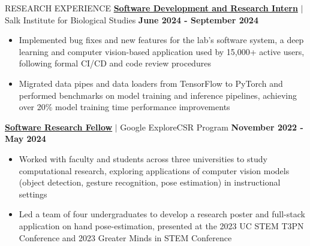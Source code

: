 \documentclass{resume}
\begin{document}
\begin{rSection}{RESEARCH EXPERIENCE}
    \href{https://talmolab.org/}{\textbf{Software Development and Research Intern}} $|$ Salk Institute for Biological Studies \hfill \textbf{June 2024 - September 2024}
    \vspace{-4pt}
    \begin{itemize}
        \itemsep -3pt {}
            \item Implemented bug fixes and new features for the lab's software system, a deep learning and computer vision-based application used by 15,000+ active users, following formal CI/CD and code review procedures
            \item  Migrated data pipes and data loaders from TensorFlow to PyTorch and performed benchmarks on model training and inference pipelines, achieving over 20\% model training time performance improvements
    \end{itemize}

   \href{https://research.google/outreach/explore-csr/}{\textbf{Software Research Fellow}} $|$ Google ExploreCSR Program \hfill \textbf{November 2022 - May 2024}
    \vspace{-4pt}
    \begin{itemize}
        \itemsep -3pt {}
            \item Worked with faculty and students across three universities to study computational research, exploring applications of computer vision models (object detection, gesture recognition, pose estimation) in instructional settings
            \item Led a team of four undergraduates to develop a research poster and full-stack application on hand pose-estimation, presented at the 2023 UC STEM T3PN Conference and 2023 Greater Minds in STEM Conference
    \end{itemize}
    
\end{rSection}
\end{document}
